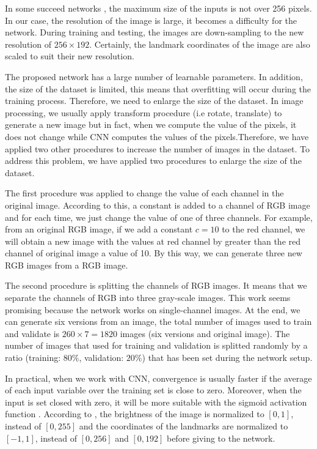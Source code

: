 \documentclass[review]{elsarticle}
\begin{document}
In some succeed networks \cite{krizhevsky2012imagenet}\cite{sun2013deep}\cite{cintas2016automatic}, the maximum size of the inputs is not over 256 pixels. In our case, the resolution of the image is large, it becomes a difficulty for the network. During training and testing, the images are down-sampling to the new resolution of $256 \times 192$. Certainly, the landmark coordinates of the image are also scaled to suit their new resolution. 

The proposed network has a large number of learnable parameters. In addition, the size of the dataset is limited, this means that overfitting will occur during the training process. Therefore, we need to enlarge the size of the dataset. In image processing, we usually apply transform procedure (i.e rotate, translate) to generate a new image but in fact, when we compute the value of the pixels, it does not change while CNN computes the values of the pixels.Therefore, we have applied two other procedures to increase the number of images in the dataset. To address this problem, we have applied two procedures to enlarge the size of the dataset.

The first procedure was applied to change the value of each channel in the original image. According to this, a constant is added to a channel of RGB image and for each time, we just change the value of one of three channels. For example, from an original RGB image, if we add a constant $c = 10$ to the red channel, we will obtain a new image with the values at red channel by greater than the red channel of original image a value of 10. By this way, we can generate three new RGB images from a RGB image.

The second procedure is splitting the channels of RGB images. It means that we separate the channels of RGB into three gray-scale images. This work seems promising because the network works on single-channel images. At the end, we can generate six versions from an image, the total number of images used to train and validate is $260 \times 7 = 1820$ images (six versions and original image). The number of images that used for training and validation is splitted randomly by a ratio (training: $80\%$, validation: $20\%$) that has been set during the network setup.

In practical, when we work with CNN, convergence is usually faster if the average of each input variable over the training set is close to zero. Moreover, when the input is set closed with zero, it will be more suitable with the sigmoid activation function \cite{lecun2012efficient}. According to \cite{lecun2012efficient}, the brightness of the image is normalized to $[0,1]$, instead of $[0,255]$ and the coordinates of the landmarks are normalized to $[-1,1]$, instead of $[0,256]$ and $[0,192]$ before giving to the network.
\end{document}
